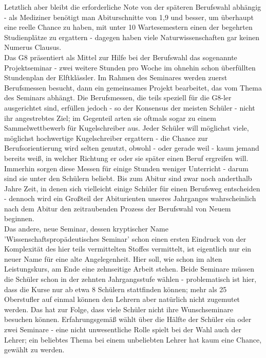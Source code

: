 \documentclass[a4paper,12pt,oneside]{scrbook}
\begin{document}
Letztlich aber bleibt die erforderliche Note von der späteren Berufswahl abhängig - als Mediziner benötigt man Abiturschnitte von 1,9 und besser, um überhaupt eine reelle Chance zu haben, mit unter 10 Wartesemestern einen der begehrten Studienplätze zu ergattern - dagegen haben viele Naturwissenschaften gar keinen Numerus Clausus.
\\
Das G8 präsentiert als Mittel zur Hilfe bei der Berufswahl das sogenannte Projektseminar - zwei weitere Stunden pro Woche im ohnehin schon überfüllten Stundenplan der Elftklässler. Im Rahmen des Seminares werden zuerst Berufsmessen besucht, dann ein gemeinsames Projekt bearbeitet, das vom Thema des Seminars abhängt. Die Berufsmessen, die teils speziell für die G8-ler ausgerichtet sind, erfüllen jedoch - so der Konsensus der meisten Schüler - nicht ihr angestrebtes Ziel; im Gegenteil arten sie oftmals sogar zu einem Sammelwettbewerb für Kugelschreiber aus. Jeder Schüler will möglichst viele, möglichst hochwertige Kugelschreiber ergattern - die Chance zur Berufsorientierung wird selten genutzt, obwohl - oder gerade weil - kaum jemand bereits weiß, in welcher Richtung er oder sie später einen Beruf ergreifen will. Immerhin sorgen diese Messen für einige Stunden weniger Unterricht - darum sind sie unter den Schülern beliebt. Bis zum Abitur sind zwar noch anderthalb Jahre Zeit, in denen sich vielleicht einige Schüler für einen Berufsweg entscheiden - dennoch wird ein Großteil der Abiturienten unseres Jahrganges wahrscheinlich nach dem Abitur den zeitraubenden Prozess der Berufswahl von Neuem beginnen.
\\
Das andere, neue Seminar, dessen kryptischer Name 'Wissenschaftspropädeutisches Seminar' schon einen ersten Eindruck von der Komplexität des hier teils vermittelten Stoffes vermittelt, ist eigentlich nur ein neuer Name für eine alte Angelegenheit. Hier soll, wie schon im alten Leistungskurs, am Ende eine zehnseitige Arbeit stehen. Beide Seminare müssen die Schüler schon in der zehnten Jahrgangsstufe wählen - problematisch ist hier, dass die Kurse nur ab etwa 8 Schülern stattfinden können; mehr als 25 Oberstufler auf einmal können den Lehrern aber natürlich nicht zugemutet werden. Das hat zur Folge, dass viele Schüler nicht ihre Wunschseminare besuchen können. Erfahrungsgemäß wählt über die Hälfte der Schüler ein oder zwei Seminare - eine nicht unwesentliche Rolle spielt bei der Wahl auch der Lehrer; ein beliebtes Thema bei einem unbeliebten Lehrer hat kaum eine Chance, gewählt zu werden.
\\
\end{document}
